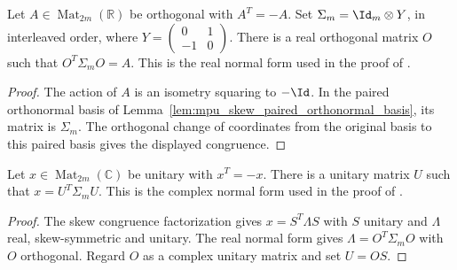 \begin{lemma}
    \label{thm:mpu_real_skew_orthogonal_normal_form}
    \leanok
    Let $A\in\operatorname{Mat}_{2m}(\mathbb R)$ be orthogonal with
    $A^T=-A$. Set $\Sigma_m=\Id_m\otimes Y$, in interleaved order, where
    $Y=\left(\begin{smallmatrix}0&1\\-1&0\end{smallmatrix}\right)$.
    There is a real orthogonal matrix $O$ such that
    $O^T\Sigma_m O=A$.
    This is the real normal form used in the proof of
    \cite[Proposition~V.2]{Cirac2017MPU}.
\end{lemma}

\begin{proof}\leanok
    The action of $A$ is an isometry squaring to $-\Id$. In the paired
    orthonormal basis of Lemma~\ref{lem:mpu_skew_paired_orthonormal_basis},
    its matrix is $\Sigma_m$. The orthogonal change of coordinates from
    the original basis to this paired basis gives the displayed congruence.
\end{proof}

\begin{lemma}
    \label{thm:mpu_complex_skew_unitary_normal_form}
    \leanok
    Let $x\in\operatorname{Mat}_{2m}(\mathbb C)$ be unitary with $x^T=-x$.
    There is a unitary matrix $U$ such that $x=U^T\Sigma_m U$.
    This is the complex normal form used in the proof of
    \cite[Proposition~V.2]{Cirac2017MPU}.
\end{lemma}

\begin{proof}\leanok
    The skew congruence factorization gives $x=S^T\Lambda S$ with $S$
    unitary and $\Lambda$ real, skew-symmetric and unitary.
    The real normal form gives $\Lambda=O^T\Sigma_m O$ with $O$ orthogonal.
    Regard $O$ as a complex unitary matrix and set $U=OS$.
\end{proof}

